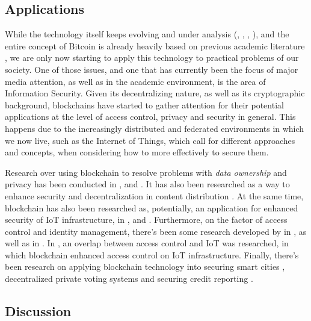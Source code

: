 \subsection{Applications}

While the technology itself keeps evolving and under analysis (\cite{eyal_bitcoin-ng:_2016}, \cite{wang_research_2018}, \cite{gervais_security_2016}, \cite{lin_survey_2017}), and the entire concept of Bitcoin is already heavily based on previous academic literature \cite{narayanan_bitcoins_2017}, we are only now starting to apply this technology to practical problems of our society. One of those issues, and one that has currently been the focus of major media attention, as well as in the academic environment, is the area of Information Security. Given its decentralizing nature, as well as its cryptographic background, blockchains have started to gather attention for their potential applications at the level of access control, privacy and security in general. This happens due to the increasingly distributed and federated environments in which we now live, such as the Internet of Things, which call for different approaches and concepts, when considering how to more effectively to secure them.

Research over using blockchain to resolve problems with \textit{data ownership} and privacy has been conducted in \cite{zyskind_decentralizing_2015}, \cite{liang_provchain:_2017} and \cite{yue_healthcare_2016}. It has also been researched as a way to enhance security and decentralization in content distribution \cite{fotiou_decentralized_2016}. At the same time, blockchain has also been researched as, potentially, an application for enhanced security of IoT infrastructure, in \cite{dorri_blockchain_2016}, \cite{dorri_blockchain_2017} and \cite{ouaddah_access_2017}. Furthermore, on the factor of access control and identity management, there's been some research developed by \citeauthor{augot_identity_2017} in \cite{augot_identity_2017}, as well as \citeauthor{maesa_blockchain_2017} in \cite{maesa_blockchain_2017}. In \cite{ouaddah_fairaccess:_2017}, an overlap between access control and IoT was researched, in which blockchain enhanced access control on IoT infrastructure. Finally, there's been research on applying blockchain technology into securing smart cities \cite{biswas_securing_2016}, decentralized private voting systems \cite{sheer_hardwick_e-voting_2018} and securing credit reporting \cite{kafshdar_goharshady_secure_2018}.

\subsection{Discussion}

